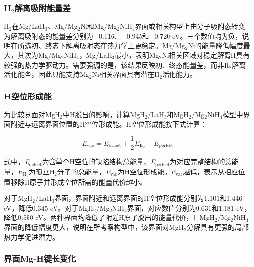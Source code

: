 \documentclass[preprint,12pt]{elsarticle}
\begin{document}
\subsubsection{\texorpdfstring{H$_{2}$}{H2}解离吸附能量差}

H$_{\mathrm{2}}$在Mg/LaH$_{\mathrm{3}}$、Mg/Mg$_{\mathrm{2}}$Ni和Mg/Mg$_{\mathrm{2}}$NiH$_{\mathrm{4}}$界面或相关构型上由分子吸附态转变为解离吸附态的能量差分别为−0.116、−0.945和−0.720 eV。三个数值均为负，说明在所选初、终态下解离吸附态在热力学上更稳定。Mg/Mg$_{\mathrm{2}}$Ni的能量降低幅度最大，其次为Mg/Mg$_{\mathrm{2}}$NiH$_{\mathrm{4}}$，Mg/LaH$_{\mathrm{3}}$最小，表明Mg$_{\mathrm{2}}$Ni相关区域对稳定解离H具有较强的热力学驱动力。需要强调的是，该结果反映初、终态能量差，而非H$_{\mathrm{2}}$解离活化能垒，因此只能支持Mg$_{\mathrm{2}}$Ni相关界面具有潜在H$_{\mathrm{2}}$活化能力。

\subsubsection{H空位形成能}

为比较界面对MgH$_{\mathrm{2}}$中H脱出的影响，计算MgH$_{\mathrm{2}}$/LaH$_{\mathrm{3}}$和MgH$_{\mathrm{2}}$/Mg$_{\mathrm{2}}$NiH$_{\mathrm{4}}$模型中界面附近与远离界面位置的H空位形成能。H空位形成能按下式计算：

\begin{equation}E_{\mathrm{vac}}=E_{\mathrm{defect}}+\frac{1}{2}E_{\mathrm{H}_2}-E_{\mathrm{perfect}}\label{eq:vacancy}\end{equation}

式中，\textit{E}$_{\mathrm{defect}}$为含单个H空位的缺陷结构总能量，\textit{E}$_{\mathrm{perfect}}$为对应完整结构的总能量，$E_{\mathrm{H}_2}$为孤立H$_{\mathrm{2}}$分子的总能量，\textit{E}$_{\mathrm{vac}}$为H空位形成能。\textit{E}$_{\mathrm{vac}}$越低，表示从相应位置移除H原子并形成空位所需的能量代价越小。

对于MgH$_{\mathrm{2}}$/LaH$_{\mathrm{3}}$界面，界面附近和远离界面的H空位形成能分别为1.101和1.446 eV，降低0.345 eV。对于MgH$_{\mathrm{2}}$/Mg$_{\mathrm{2}}$NiH$_{\mathrm{4}}$界面，对应数值分别为0.631和1.181 eV，降低0.550 eV。两种界面均降低了附近H原子脱出的能量代价，且MgH$_{\mathrm{2}}$/Mg$_{\mathrm{2}}$NiH$_{\mathrm{4}}$界面的降低幅度更大，说明在所考察构型中，该界面对MgH$_{\mathrm{2}}$分解具有更强的局部热力学促进潜力。

\subsubsection{界面Mg-H键长变化}
\end{document}

